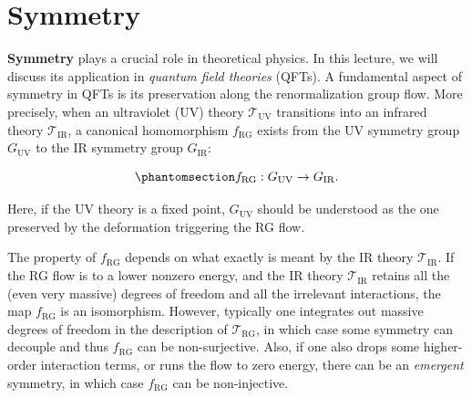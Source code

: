 \documentclass[
  letterpaper,
  DIV=11,
  numbers=noendperiod]{scrreport}
\begin{document}
\section{Symmetry}\label{symmetry}

\textbf{Symmetry} plays a crucial role in theoretical physics. In this
lecture, we will discuss its application in \emph{quantum field
theories} (QFTs). A fundamental aspect of symmetry in QFTs is its
preservation along the renormalization group flow. More precisely, when
an ultraviolet (UV) theory \(\mathcal{T}_\text{UV}\) transitions into an
infrared theory \(\mathcal{T}_\text{IR}\), a canonical homomorphism
\(f_\text{RG}\) exists from the UV symmetry group \(G_\text{UV}\) to the
IR symmetry group \(G_\text{IR}\):

\begin{tcolorbox}[enhanced jigsaw, breakable, coltitle=black, title=\textcolor{quarto-callout-important-color}{\faExclamation}\hspace{0.5em}{RG flow homomorphism from UV symmetry to IR symmetry}, arc=.35mm, leftrule=.75mm, bottomrule=.15mm, colback=white, bottomtitle=1mm, toptitle=1mm, left=2mm, titlerule=0mm, rightrule=.15mm, colbacktitle=quarto-callout-important-color!10!white, colframe=quarto-callout-important-color-frame, opacityback=0, toprule=.15mm, opacitybacktitle=0.6]

\begin{equation}\phantomsection\label{eq-RG-group-match}{
f_\text{RG} : G_\text{UV} \to G_\text{IR}.
}\end{equation}

\end{tcolorbox}

Here, if the UV theory is a fixed point, \(G_\text{UV}\) should be
understood as the one preserved by the deformation triggering the RG
flow.

\begin{tcolorbox}[enhanced jigsaw, breakable, coltitle=black, title=\textcolor{quarto-callout-note-color}{\faInfo}\hspace{0.5em}{Property of \(f_\text{RG}\)}, arc=.35mm, leftrule=.75mm, bottomrule=.15mm, colback=white, bottomtitle=1mm, toptitle=1mm, left=2mm, titlerule=0mm, rightrule=.15mm, colbacktitle=quarto-callout-note-color!10!white, colframe=quarto-callout-note-color-frame, opacityback=0, toprule=.15mm, opacitybacktitle=0.6]

The property of \(f_\text{RG}\) depends on what exactly is meant by the
IR theory \(\mathcal{T}_\text{IR}\). If the RG flow is to a lower
nonzero energy, and the IR theory \(\mathcal{T}_\text{IR}\) retains all
the (even very massive) degrees of freedom and all the irrelevant
interactions, the map \(f_\text{RG}\) is an isomorphism. However,
typically one integrates out massive degrees of freedom in the
description of \(\mathcal{T}_\text{RG}\), in which case some symmetry
can decouple and thus \(f_\text{RG}\) can be non-surjective. Also, if
one also drops some higher-order interaction terms, or runs the flow to
zero energy, there can be an \emph{emergent} symmetry, in which case
\(f_\text{RG}\) can be non-injective.

\end{tcolorbox}
\end{document}
